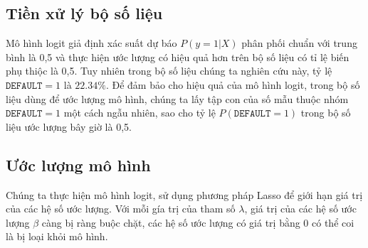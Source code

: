 \subsection{Tiền xử lý bộ số liệu}
Mô hình logit giả định xác suất dự báo  $P(y = 1|X)$  phân phối chuẩn với trung bình là 0,5 và thực hiện ước lượng có hiệu quả hơn trên bộ số liệu có tỉ lệ biến phụ thiộc là 0,5. 
Tuy nhiên trong bộ số liệu chúng ta nghiên cứu này, tỷ lệ  $\texttt{DEFAULT} = 1$ là $22.34\%$.
Để đảm bảo cho hiệu quả của mô hình logit, trong bộ số liệu dùng để ước lượng mô hình, chúng ta lấy tập con của số mẫu thuộc nhóm $\texttt{DEFAULT} = 1$ một cách ngẫu nhiên, sao cho tỷ lệ  $P(\texttt{DEFAULT} = 1)$ trong bộ số liệu ước lượng bây giờ là 0,5. 

\subsection{Ước lượng mô hình} 
\begin{knitrout}
\color{fgcolor}\begin{kframe}
\begin{alltt}
 \hlkwb{<-}\hlopt{$}\hlopt{$}
                    \hlstd{=} \hlstd{,}  \hlstd{=} \hlstd{)}
\end{alltt}


{\ttfamily\noindent\bfseries{}}\begin{alltt}
 \hlkwb{<-} \hlopt{$}\hlopt{$}
                       \hlstd{=} \hlstd{,}  \hlstd{=} \hlstd{)}
\end{alltt}


{\ttfamily\noindent\bfseries{}}\end{kframe}
\end{knitrout}

Chúng ta thực hiện mô hình logit, sử dụng phương pháp Lasso để giới hạn giá trị của các hệ số ước lượng. 
Với mỗi gía trị của tham số $\lambda$, giá trị của các hệ số ước lượng $\beta$ càng bị ràng buộc chặt, các hệ số ước lượng có giá trị bằng 0 có thể coi là bị loại khỏi mô hình.

